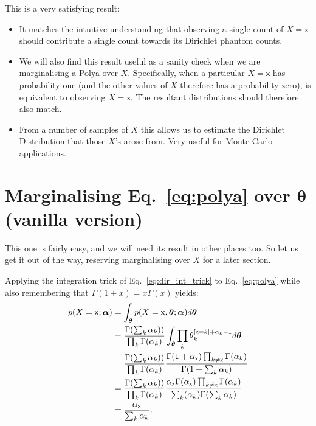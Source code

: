 \documentclass[oneside,english]{scrbook}
\begin{document}
This is a very satisfying result:
\begin{itemize}
  \item It matches the intuitive understanding that observing a single
    count of $X = \mathsf{x}$ should contribute a single count towards
    its Dirichlet phantom counts.
  \item We will also find this result useful as a sanity check when we
    are marginalising a Polya over $X$. Specifically, when a
    particular $X = \mathsf{x}$ has probability one (and the other
    values of $X$ therefore has a probability zero), is equivalent to
    observing $X = \mathsf{x}$. The resultant distributions should
    therefore also match.
  \item From a number of samples of $X$ this allows us to estimate the
    Dirichlet Distribution that those $X$'s arose from. Very useful
    for Monte-Carlo applications.
\end{itemize}

\section{Marginalising Eq.~\ref{eq:polya} over $\bm{\theta}$ (vanilla version)}
This one is fairly easy, and we will need its result in other places
too. So let us get it out of the way, reserving marginalising over $X$
for a later section.

Applying the integration trick of Eq.~\ref{eq:dir_int_trick} to
Eq.~\ref{eq:polya} while also remembering that $\Gamma(1+x) =
x\Gamma(x)$ yields:
\begin{align}
  p(X=\mathsf{x};\bm{\alpha})
  &= \int_{\bm{\theta}}p(X=\mathsf{x},\bm{\theta};\bm{\alpha})d\bm{\theta} \notag \\
  &= \frac{\Gamma(\sum_k\alpha_k))}{\prod_{k}\Gamma(\alpha_k)} \int_{\bm{\theta}} \prod_{k}\theta_k^{\mathbb{[}\mathsf{x}=k\mathbb{]}+\alpha_k-1}d\bm{\theta} \notag \\
  &= \frac{\Gamma(\sum_k\alpha_k))}{\prod_{k}\Gamma(\alpha_k)} \frac{\Gamma(1+\alpha_{\mathsf{x}})\prod_{k\neq\mathsf{x}}\Gamma(\alpha_k)}{\Gamma(1+\sum_k\alpha_k)} \notag\\
  &= \frac{\Gamma(\sum_k\alpha_k))}{\prod_{k}\Gamma(\alpha_k)} \frac{\alpha_{\mathsf{x}}\Gamma(\alpha_{\mathsf{x}})\prod_{k\neq\mathsf{x}}\Gamma(\alpha_k)}{\sum_k(\alpha_k)\Gamma(\sum_k\alpha_k)} \notag\\
  &=  \frac{\alpha_{\mathsf{x}}}{\sum_k\alpha_k}. \label{eq:marg_theta_van}
\end{align}
\end{document}

